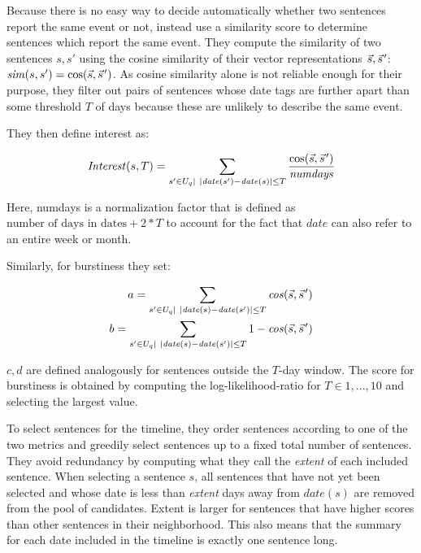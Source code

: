 \documentclass[a4paper,BCOR=10mm]{report}
\newcommand{\pvec}[1]{\vec{#1}\mkern2mu\vphantom{#1}}
\numberwithin{lemma}{chapter}
\numberwithin{definition}{chapter}
\begin{document}
Because there is no easy way to decide automatically whether two sentences report the same event or not, \citeauthor{chieu} instead use a similarity score to determine sentences which report the same event. They compute the similarity of two sentences $s, s'$ using the cosine similarity of their vector representations $\vec{s}, \pvec{s}'$: $\mathit{sim}(s, s') = \cos(\vec{s}, \pvec{s}')$.
As cosine similarity alone is not reliable enough for their purpose, they filter out pairs of sentences whose date tags are further apart than some threshold $T$ of days because these are unlikely to describe the same event.

They then define interest as:

\begin{equation}
\mathit{Interest}(s, T) = \sum_{s' \in U_q | |\mathit{date}(s') - \mathit{date}(s)| \leq T} \frac{\cos(\vec{s}, \pvec{s}')}{\mathit{numdays}}
\end{equation}

Here, numdays is a normalization factor that is defined as $\text{number of days in dates} + 2 * T$ to account for the fact that $\mathit{date}$ can also refer to an entire week or month.

Similarly, for burstiness they set:

\begin{align}
a = \sum_{s' \in U_q | |\mathit{date}(s) - \mathit{date}(s')| \leq T} \mathit{cos}(\vec{s}, \pvec{s}') \\
b = \sum_{s' \in U_q | |\mathit{date}(s) - \mathit{date}(s')| \leq T} 1 - \mathit{cos}(\vec{s}, \pvec{s}')
\end{align}

$c, d$ are defined analogously for sentences outside the $T$-day window. The score for burstiness is obtained by computing the log-likelihood-ratio for $T \in 1, ..., 10$ and selecting the largest value.

To select sentences for the timeline, they order sentences according to one of the two metrics and greedily select sentences up to a fixed total number of sentences.
They avoid redundancy by computing what they call the \textit{extent} of each included sentence. When selecting a sentence $s$, all sentences that have not yet been selected and whose date is less than \textit{extent} days away from $\mathit{date}(s)$ are removed from the pool of candidates. Extent is larger for sentences that have higher scores than other sentences in their neighborhood.
This also means that the summary for each date included in the timeline is exactly one sentence long.
\end{document}
